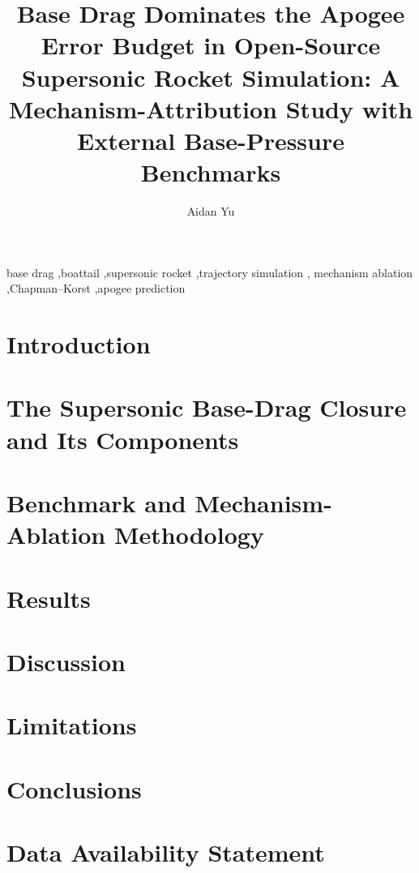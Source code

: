 \documentclass[preprint,authoryear,12pt]{elsarticle}
\begin{document}
\doublespacing
\linenumbers

\begin{frontmatter}

\title{Base Drag Dominates the Apogee Error Budget in Open-Source Supersonic Rocket Simulation: A Mechanism-Attribution Study with External Base-Pressure Benchmarks}

\author[aff]{Aidan Yu}
\address[aff]{Department of Mechanical Engineering \& Materials Science, Duke University, Durham, NC~27708, USA}

\begin{abstract}

\end{abstract}

\begin{keyword}
base drag \sep boattail \sep supersonic rocket \sep trajectory simulation \sep
mechanism ablation \sep Chapman--Korst \sep apogee prediction
\end{keyword}

\end{frontmatter}

\section{Introduction}


\section{The Supersonic Base-Drag Closure and Its Components}


\section{Benchmark and Mechanism-Ablation Methodology}


\section{Results}


\section{Discussion}


\section{Limitations}


\section{Conclusions}


\section*{Data Availability Statement}




\end{document}
